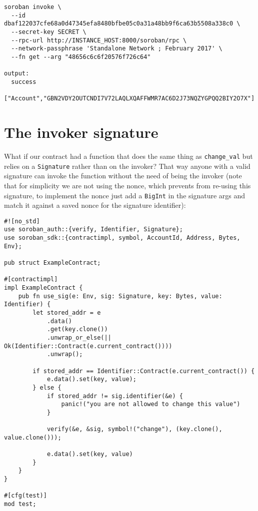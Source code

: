 \documentclass[10pt]{article}
\begin{document}
\begin{verbatim}
soroban invoke \                                        
  --id dbaf122037cfe68a0d47345efa8480bfbe05c0a31a48bb9f6ca63b5508a338c0 \
  --secret-key SECRET \
  --rpc-url http://INSTANCE_HOST:8000/soroban/rpc \
  --network-passphrase 'Standalone Network ; February 2017' \
  --fn get --arg "48656c6c6f20576f726c64"   

output:
  success
  ["Account","GBN2VDY2OUTCNDI7V72LAQLXQAFFWMR7AC6D2J73NQZYGPQQ2BIY2O7X"]
\end{verbatim}

\section*{The invoker signature}
What if our contract had a function that does the same thing as \texttt{change\_val} but relies on a \texttt{Signature} rather than on the invoker? That way anyone with a valid signature can invoke the function without the need of being the invoker (note that for simplicity we are not using the nonce, which prevents from re-using this signature, to implement the nonce just add a \texttt{BigInt} in the signature args and match it against a saved nonce for the signature identifier):

\begin{verbatim}
#![no_std]
use soroban_auth::{verify, Identifier, Signature};
use soroban_sdk::{contractimpl, symbol, AccountId, Address, Bytes, Env};

pub struct ExampleContract;

#[contractimpl]
impl ExampleContract {
    pub fn use_sig(e: Env, sig: Signature, key: Bytes, value: Identifier) {
        let stored_addr = e
            .data()
            .get(key.clone())
            .unwrap_or_else(|| Ok(Identifier::Contract(e.current_contract())))
            .unwrap();

        if stored_addr == Identifier::Contract(e.current_contract()) {
            e.data().set(key, value);
        } else {
            if stored_addr != sig.identifier(&e) {
                panic!("you are not allowed to change this value")
            }

            verify(&e, &sig, symbol!("change"), (key.clone(), value.clone()));

            e.data().set(key, value)
        }
    }
}

#[cfg(test)]
mod test;

\end{verbatim}
\end{document}
